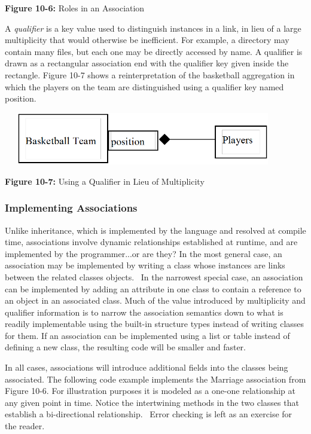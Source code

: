 {\sffamily\bfseries Figure 10-6:}
{\sffamily Roles in an Association}

\bigskip

A \textit{qualifier} is a key value used to
distinguish instances in a link, in lieu of a large
multiplicity that would otherwise be inefficient. For example, a
directory may contain many files, but each one may be directly accessed
by name. A qualifier is drawn as a rectangular association end with the
qualifier key given inside the rectangle. Figure 10-7 shows a
reinterpretation of the basketball aggregation in which the players on
the team are distinguished using a qualifier key named position.


\bigskip

\includegraphics[width=4.8in,height=0.9in]{ub-img/qualifier.png}

{\sffamily\bfseries Figure 10-7:}
{\sffamily Using a Qualifier in Lieu of Multiplicity}

\subsubsection{Implementing Associations}

Unlike inheritance, which is implemented by the language and resolved at
compile time, associations involve dynamic
relationships established at runtime, and are implemented by the
programmer...or are they? In the most general case, an association may
be implemented by writing a class whose instances are links between the
related classes{\textquotesingle} objects. \ In the narrowest special
case, an association can be implemented by adding an attribute in one
class to contain a reference to an object in an
associated class. Much of the value introduced by multiplicity and
qualifier information is to narrow the association semantics down to
what is readily implementable using the built-in structure types
instead of writing classes for them. If an association can be
implemented using a list or table instead of defining a new class, the
resulting code will be smaller and faster.

In all cases, associations will introduce additional fields into the
classes being associated. The following code example implements the
Marriage association from Figure 10-6. For illustration purposes it is
modeled as a one-one relationship at any given point in time. Notice
the intertwining methods in the two classes that establish a
bi-directional relationship. \ Error checking is left as an exercise
for the reader.

